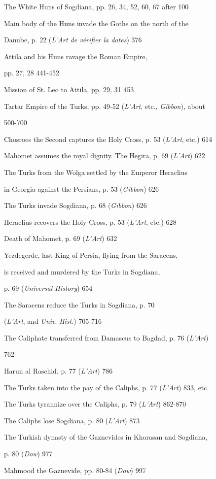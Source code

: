 The White Huns of Sogdiana, pp. 26, 34, 52, 60,
67
after 100

Main body of the Huns invade the Goths on the
north of the

Danube, p. 22 (\emph{L'Art de vérifier la
dates})
376

Attila and his Huns ravage the Roman
Empire,

pp. 27, 28
441-452

Mission of St. Leo to Attila, pp. 29, 31
453

Tartar Empire of the Turks, pp. 49-52 (\emph{L'Art}, etc., \emph{Gibbon}),
about

500-700

Chosroes the Second captures the Holy Cross, p.
53 (\emph{L'Art}, etc.)
614

Mahomet assumes the royal dignity. The Hegira,
p. 69 (\emph{L'Art})
622

The Turks from the Wolga settled by the Emperor
Heraclius

in Georgia against the Persians, p. 53 (\emph{Gibbon})
626

The Turks invade Sogdiana, p. 68 (\emph{Gibbon})
626

Heraclius recovers the Holy Cross, p. 53 (\emph{L'Art},
etc.)
628

Death of Mahomet, p. 69 (\emph{L'Art})
632

Yezdegerde, last King of Persia, flying from
the Saracens,

is received and murdered by the Turks in
Sogdiana,

p. 69 (\emph{Universal History})
654

The Saracens reduce the Turks in Sogdiana, p.
70 

(\emph{L'Art}, and \emph{Univ}. \emph{Hist}.)
705-716

The Caliphate transferred from Damascus to Bagdad, p. 76 (\emph{L'Art})

762

Harun al Raschid, p. 77 (\emph{L'Art})
786

The Turks taken into the pay of the Caliphs, p.
77 (\emph{L'Art})
833, etc.

The Turks tyrannize over the Caliphs, p. 79 (\emph{L'Art})
862-870

The Caliphs lose Sogdiana, p. 80 (\emph{L'Art})
873

The Turkish dynasty of the Gaznevides in
Khorasan and Sogdiana,

p. 80 (\emph{Dow})
977

Mahmood the Gaznevide, pp. 80-84 (\emph{Dow})
997

